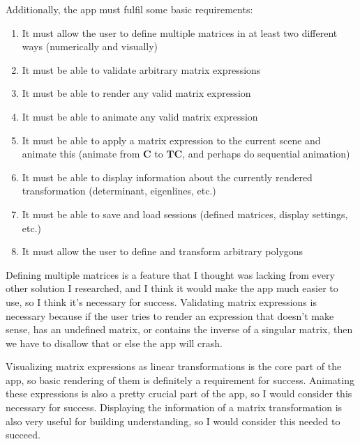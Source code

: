 \documentclass[../main.tex]{subfiles}
\begin{document}
Additionally, the app must fulfil some basic requirements:
\vspace{-0.3cm}
\begin{enumerate}
	\item\label{success-criterion:define-multiple-matrices} It must allow the user to define multiple matrices in at least two different ways (numerically and visually)
	\item\label{success-criterion:validate-arbitrary-matrix-expressions} It must be able to validate arbitrary matrix expressions
	\item\label{success-criterion:render-any-valid-expression} It must be able to render any valid matrix expression
	\item\label{success-criterion:animate-any-valid-expression} It must be able to animate any valid matrix expression
	\item\label{success-criterion:applicative-animation} It must be able to apply a matrix expression to the current scene and animate this (animate from $\mathbf{C}$ to $\mathbf{TC}$, and perhaps do sequential animation)
	\item\label{success-criterion:display-matrix-info} It must be able to display information about the currently rendered transformation (determinant, eigenlines, etc.)
	\item\label{success-criterion:save-and-load-sessions} It must be able to save and load sessions (defined matrices, display settings, etc.)
	\item\label{success-criterion:transform-polygons} It must allow the user to define and transform arbitrary polygons
\end{enumerate}

Defining multiple matrices is a feature that I thought was lacking from every other solution I researched, and I think it would make the app much easier to use, so I think it's necessary for success. Validating matrix expressions is necessary because if the user tries to render an expression that doesn't make sense, has an undefined matrix, or contains the inverse of a singular matrix, then we have to disallow that or else the app will crash.

Visualizing matrix expressions as linear transformations is the core part of the app, so basic rendering of them is definitely a requirement for success. Animating these expressions is also a pretty crucial part of the app, so I would consider this necessary for success. Displaying the information of a matrix transformation is also very useful for building understanding, so I would consider this needed to succeed.
\end{document}
